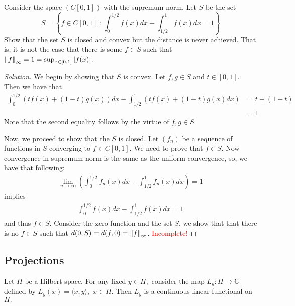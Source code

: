 \begin{exercise}
    Consider the space $\left( C[0,1] \right)$ with the supremum norm. Let $S$ be the set
    \begin{equation*}
	S=\left\{ f \in C[0,1] \, : \, \int_{0}^{1/2} f\left( x \right) dx - \int_{1/2}^{1} f \left( x \right) dx =1 \right\}
    \end{equation*}
    Show that the set $S$ is closed and convex but the distance is never achieved. That is, it is not the case that there is some $f\in S$ such that $\left\lVert f \right\rVert_{\infty} = 1 =\sup_{x\in [0,1]} |f(x)|$.
\end{exercise}
\begin{proof}[Solution]
    We begin by showing that $S$ is convex. Let $f, g \in S$ and $t\in [0,1]$. Then we have that 
    \begin{align*}
	\int_{0}^{1/2} \left( t f\left( x \right) + \left( 1-t \right) g\left( x \right)\right) dx - \int_{1/2}^{1} \left( t f\left( x \right) + \left( 1-t \right) g\left( x \right) dx  \right) &= t + (1-t) \\
	&= 1
    \end{align*}
    Note that the second equality follows by the virtue of $f,g \in S$.

    Now, we proceed to show that the $S$ is closed. Let $\left( f_{n} \right) $ be a sequence of functions in $S$ converging to $f \in C\left[ 0,1 \right]$. We need to prove that $f \in S$. Now convergence in supremum norm is the same as the uniform convergence, so, we have that following:
    \begin{align*}
	\lim_{n\to \infty}\left( \int_{0}^{1/2} f_{n}\left( x \right) dx - \int_{1/2}^{1} f_{n} \left( x \right) dx \right) =1
    \end{align*}
    implies 
    \begin{align*}
\int_{0}^{1/2} f\left( x \right) dx - \int_{1/2}^{1} f \left( x \right) dx =1 
\end{align*}
and thus $f \in S$.
Consider the zero function and the set $S$, we show that that there is no $f \in S$ such that $d (0,S) = d(f,0)=\left\lVert f \right\rVert_{\infty}$. \textcolor{red}{Incomplete!}
\end{proof}

\subsection{Projections}
\begin{theorem}
Let $H$ be a Hilbert space. For any fixed $y\in H,$ consider the map $L_y : H \to \mathbb C$ defined by $L_y(x)= \langle x, y \rangle,\,\,x\in H.$ Then $L_y$ is a continuous linear functional on $H.$ 
    \label{thm:ip-linear-functional}
\end{theorem}

